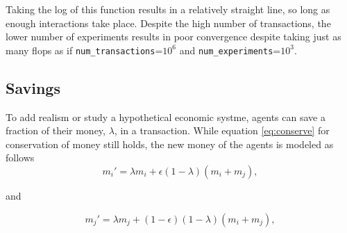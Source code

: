 \documentclass[12pt]{article} %
\begin{document}
Taking the log of this function results in a relatively straight line, so long
as enough interactions take place. Despite the high number of transactions, the
lower number of experiments results in poor convergence despite taking just as
many flops as if \texttt{num\_transactions}=$10^6$ and
\texttt{num\_experiments}=$10^3$.

\subsection{Savings}
To add realism or study a hypothetical economic systme, agents can save a
fraction of their money, $\lambda$, in a transaction. While equation
\eqref{eq:conserve} for conservation of money still holds, the new money of
the agents is modeled as follows
\begin{equation*}
  m_i' = \lambda m_i+\epsilon(1-\lambda)(m_i+m_j),
\end{equation*}

and

\begin{equation*}
  m_j' = \lambda m_j+(1-\epsilon)(1-\lambda)(m_i+m_j),
\end{equation*}
\end{document}
